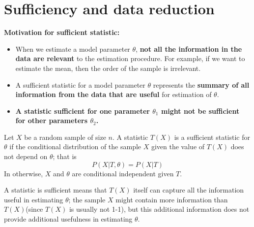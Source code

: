 \begin{refsection}
\begin{example}
\begin{itemize}
	\end{itemize}
	
\end{example}

\section{Sufficiency and data reduction}

\begin{mdframed}
	\textbf{Motivation for sufficient statistic:}\\
	\begin{itemize}
		\item When we estimate a model parameter $\theta$, \textbf{not all the information in the data are relevant} to the estimation procedure. For example, if we want to estimate the mean, then the order of the sample is irrelevant.
		\item A sufficient statistic for a model parameter $\theta$ represents the \textbf{summary of all information from the data that are useful} for estimation of $\theta$.
		\item \textbf{A statistic sufficient for one parameter $\theta_1$ might not be sufficient for other parameters $\theta_2$.}
	\end{itemize}
\end{mdframed}


\begin{definition}
	Let $X$ be a random sample of size $n$. A statistic $T(X)$ is a sufficient statistic for $\theta$ if the conditional distribution of the sample $X$ given the value of $T(X)$ does not depend on $\theta$; that is
	$$P(X|T,\theta) = P(X|T)$$
	In otherwise, $X$ and $\theta$ are conditional independent given $T$.
\end{definition}



\begin{remark}
	A statistic is sufficient means that $T(X)$ itself can capture all the information useful in estimating $\theta$; the sample $X$ might contain more information than $T(X)$(since $T(X)$ is usually not 1-1), but this additional information does not provide additional usefulness in estimating $\theta$.
\end{remark}


\end{refsection}
